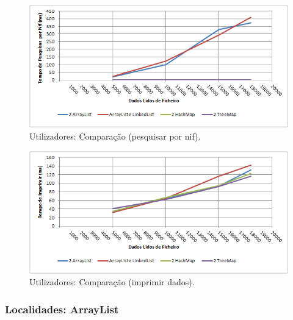 \documentclass[a5paper,twocolumn, 11pt]{article}
\begin{document}
\begin{figure}[h!b!t!]
    \caption[Utilizadores: Comparação (pesquisar por nif)]{Utilizadores: Comparação (pesquisar por nif).}
    \label{hashtable}
    \centering
        \includegraphics[width=400pt]{cusers_o4.png}
\end{figure}
\begin{figure}[h!b!t!]
    \caption[Utilizadores: Comparação (imprimir dados)]{Utilizadores: Comparação (imprimir dados).}
    \label{hashtable}
    \centering
        \includegraphics[width=400pt]{cusers_o5.png}
\end{figure}

\twocolumn
\newpage














\subsubsection{Localidades: ArrayList}
\end{document}
